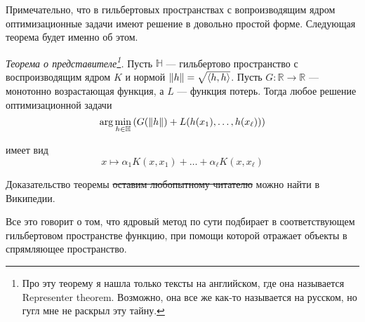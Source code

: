 \documentclass[12pt]{article}
\newcommand{\R}{\mathbb{R}}
\begin{document}
\par Примечательно, что в гильбертовых пространствах с вопроизводящим ядром оптимизационные задачи имеют решение в довольно простой форме. Следующая теорема будет именно об этом.
\par \textit{Теорема о представителе\footnote{Про эту теорему я нашла только тексты на английском, где она называется Representer theorem. Возможно, она все же как-то называется на русском, но гугл мне не раскрыл эту тайну.}.} Пусть $ \mathbb{H} $ --- гильбертово пространство с воспроизводящим ядром $ K $ и нормой $ \norm{h} = \sqrt{\langle h, h \rangle} $. Пусть $ G : \R \to \R $ --- монотонно возрастающая функция, а $ L $ --- функция потерь. Тогда любое решение оптимизационной задачи
\[
    \arg \min_{h \in \mathbb{H}} \left(G(\norm{h}) + L(h(x_1), \ldots, h(x_\ell))\right)
\]
\par имеет вид
\[
    x \mapsto \alpha_1 K(x, x_1) + \ldots + \alpha_\ell K(x, x_\ell)
\]
\par Доказательство теоремы \sout{оставим любопытному читателю} можно найти в Википедии.

\par Все это говорит о том, что ядровый метод по сути подбирает в соответствующем гильбертовом пространстве функцию, при помощи которой отражает объекты в спрямляющее пространство.
\end{document}
